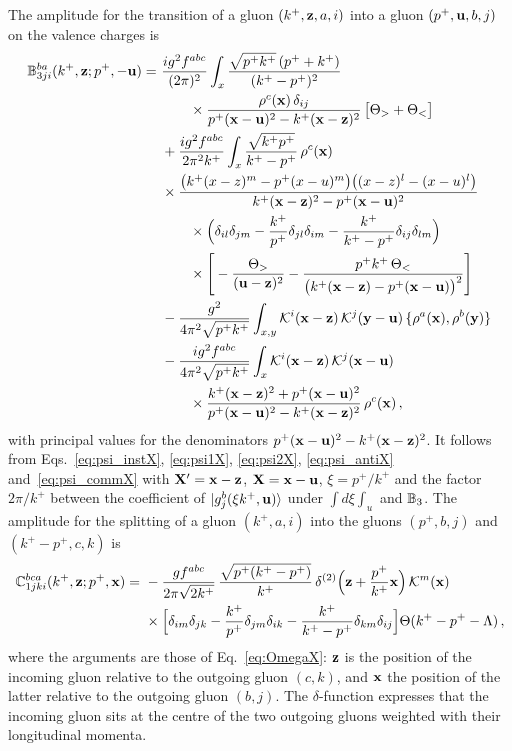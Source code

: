 The amplitude for the transition of a gluon $(k^+,\mathbf{z},a,i)$ into a gluon $(p^+,\mathbf{u},b,j)$ on the valence charges is
\begin{align}\label{eq:B3X}
\mf B^{ba}_{3ji}(k^+,\v z;p^+,-\v u)=\ &\frac{ig^2f^{abc}}{(2\pi)^2}\int_x\frac{\sqrt{p^+k^+}\,(p^++k^+)}{(k^+-p^+)^2}\,
\notag\\&\qquad\times\frac{\rho^c(\v x)\,\delta_{ij}}{p^+(\v x-\v u)^2-k^+(\v x-\v z)^2}\,\big[\Theta_>+\Theta_<\big]
\notag\\&
+\frac{ig^2f^{abc}}{2\pi^2k^+}\int_x\frac{\sqrt{k^+p^+}}{k^+-p^+}\,\rho^c(\v x)
\notag\\&\times\frac{\big(k^+(x-z)^m-p^+(x-u)^m\big)\big((x-z)^l-(x-u)^l\big)}{k^+(\v x-\v z)^2-p^+(\v x-\v u)^2}
\notag\\&\qquad\times\Big(\delta_{il}\delta_{jm}-\frac{k^+}{p^+}\delta_{jl}\delta_{im}-\frac{k^+}{k^+-p^+}\delta_{ij}\delta_{lm}\Big)
\notag\\&\qquad\times\Bigg[-\frac{\Theta_>}{(\v u-\v z)^2}-\frac{p^+k^+\,\Theta_<}{\big(k^+(\v x-\v z)-p^+(\v x-\v u)\big)^2}\Bigg]
\notag\\&
-\frac{g^2}{4\pi^2\sqrt{p^+k^+}}\int_{x,y}\Kv^i(\v x-\v z)\,\Kv^j(\v y-\v u)\,\{\rho^a(\v x),\rho^b(\v y)\}
\notag\\&
-\frac{ig^2f^{abc}}{4\pi^2\sqrt{p^+k^+}}\int_x\Kv^i(\v x-\v z)\,\Kv^j(\v x-\v u)
\notag\\&\qquad\times\frac{k^+(\v x-\v z)^2+p^+(\v x-\v u)^2}{p^+(\v x-\v u)^2-k^+(\v x-\v z)^2}\,\rho^c(\v x)\,,
\end{align}
with principal values for the denominators $p^+(\mathbf{x}-\mathbf{u})^2-k^+(\mathbf{x}-\mathbf{z})^2$. It follows from Eqs.~\eqref{eq:psi_instX}, \eqref{eq:psi1X}, \eqref{eq:psi2X}, \eqref{eq:psi_antiX} and~\eqref{eq:psi_commX} with $\mathbf{X}'=\mathbf{x}-\mathbf{z}$, $\mathbf{X}=\mathbf{x}-\mathbf{u}$, $\xi=p^+/k^+$ and the factor $2\pi/k^+$ between the coefficient of $\ket{g^b_j(\xi k^+,\mathbf{u})}$ under $\int d\xi\int_u$ and $\mathbb{B}_3$. The amplitude for the splitting of a gluon $(k^+,a,i)$ into the gluons $(p^+,b,j)$ and $(k^+-p^+,c,k)$ is
\begin{align}\label{eq:C1X}
\mf C^{bca}_{1jki}(k^+,\v z;p^+,\v x)=\ &-\frac{gf^{abc}}{2\pi\sqrt{2k^+}}\,\frac{\sqrt{p^+(k^+-p^+)}}{k^+}\,\delta^{(2)}\Big(\v z+\frac{p^+}{k^+}\v x\Big)\,\Kv^m(\v x)
\notag\\&\times\Big[\delta_{im}\delta_{jk}-\frac{k^+}{p^+}\delta_{jm}\delta_{ik}-\frac{k^+}{k^+-p^+}\delta_{km}\delta_{ij}\Big]\Theta(k^+-p^+-\Lambda)\,,
\end{align}
where the arguments are those of Eq.~\eqref{eq:OmegaX}: $\mathbf{z}$ is the position of the incoming gluon relative to the outgoing gluon $(c,k)$, and $\mathbf{x}$ the position of the latter relative to the outgoing gluon $(b,j)$. The $\delta$-function expresses that the incoming gluon sits at the centre of the two outgoing gluons weighted with their longitudinal momenta.

